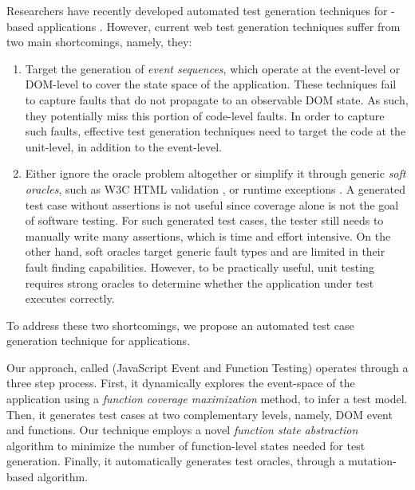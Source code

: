 Researchers have recently developed automated test generation techniques for \javascript-based applications \cite{artzi:icse11, marchetto:search, tonella:icst08, mesbah:tse12, song:symb10}. However, current web test generation techniques suffer from two main  shortcomings, namely, they:

\begin{enumerate}
\item Target the generation of \emph{event sequences}, which operate at the event-level or DOM-level to cover the state space of the application. These techniques fail to capture faults that  do not propagate to an observable DOM state. As such, they potentially miss this portion of code-level \javascript faults. In order to capture such faults, effective test generation techniques need to target the code at the \javascript unit-level, in addition to the event-level.
\item Either ignore the oracle problem altogether or simplify it through generic \emph{soft oracles}, such as  W3C HTML  validation \cite{artzi:icse11,mesbah:tse12}, or  \javascript runtime exceptions \cite{artzi:icse11}.
A generated test case without assertions is not useful since coverage alone is not the goal of software testing. For such generated test cases, the tester still needs to  manually write many assertions, which is time and effort intensive. 
On the other hand, soft oracles  target generic fault types and are limited in their fault finding capabilities.   %
However, to be practically useful, unit testing requires strong oracles  to determine whether the application under test executes correctly.
\end{enumerate}
To address these two shortcomings, we propose an automated test case  generation technique for \javascript applications. 

Our approach, called \tool (JavaScript Event and Function Testing) operates through a three step process. 
First, it dynamically explores the event-space of the application using a \emph{function coverage maximization} method, to infer a test model. Then, it generates test cases at two complementary levels, namely, DOM event and \javascript functions. Our technique employs a novel \emph{function state abstraction} algorithm to minimize the number of function-level states needed for test generation.
Finally,  it automatically generates test oracles, through a mutation-based algorithm.



